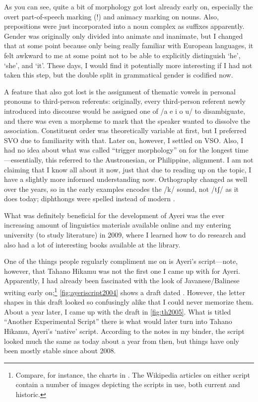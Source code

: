 As you can see, quite a bit of morphology got lost already early on, especially
the overt part-of-speech marking (!) and animacy marking on nouns. Also,
prepositions were just incorporated into a noun complex as suffixes apparently.
Gender was originally only divided into animate and inanimate, but I changed
that at some point because only being really familiar with European languages,
it felt awkward to me at some point not to be able to explicitly distinguish
`he', `she', and `it'. These days, I would find it potentially more interesting
if I had not taken this step, but the double split in grammatical gender is
codified now.

A feature that also got lost is the assignment of thematic vowels in personal
pronouns to third-person referents: originally, every third-person referent
newly introduced into discourse would be assigned one of /a e i o u/ to
disambiguate, and there was even a morpheme to mark that the speaker wanted to
dissolve the association. Constituent order was theoretically variable at
first, but I preferred SVO due to familiarity with that. Later on, however, I
settled on VSO. Also, I had no idea about what was called ``trigger
morphology'' on  for the longest time---essentially, this
referred to the Austronesian, or Philippine, alignment. I am not claiming that
I know all about it now, just that due to reading up on the topic, I have a
slightly more informed understanding now. Orthography changed as well over the
years, so  in the early examples encodes the /k/ sound, not /tʃ/ as it
does today; diphthongs were spelled  instead of modern .

What was definitely beneficial for the development of Ayeri was the ever 
increasing amount of linguistics materials available online and my entering 
university (to study literature) in 2009, where I learned how to do research 
and also had a lot of interesting books available at the library.

One of the things people regularly compliment me on is Ayeri's script---note,
however, that Tahano Hikamu was not the first one I came
up with for Ayeri. Apparently, I had already been fascinated with the look of
Javanese/Balinese writing early on;\footnote{Compare, for instance, the charts
in \citet{kuipersmcdermott1996}. The Wikipedia articles on either script
contain a number of images depicting the scripts in use, both current and
historic.} \autoref{fig:ayeriscript2004} shows a draft dated
. However, the letter shapes in this draft looked so
confusingly alike that I could never memorize them. About a year later, I came
up with the draft in \autoref{fig:th2005}. What is titled ``Another
Experimental Script'' there is what would later turn into Tahano Hikamu,
Ayeri's `native' script. According to the notes in my binder, the script
looked much the same as today about a year from then, but things have only been
mostly stable since about 2008.

